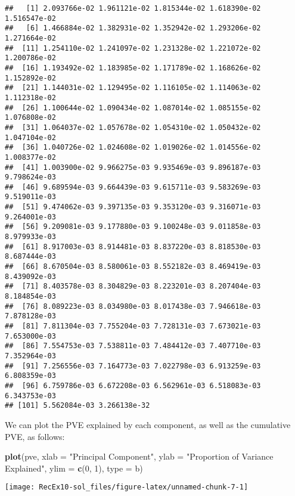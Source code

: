 \documentclass[
]{article}
\newenvironment{Shaded}{\begin{snugshade}}{\end{snugshade}}
\newcommand{\AttributeTok}[1]{\textcolor[rgb]{0.13,0.29,0.53}{#1}}
\newcommand{\DecValTok}[1]{\textcolor[rgb]{0.00,0.00,0.81}{#1}}
\newcommand{\FunctionTok}[1]{\textcolor[rgb]{0.13,0.29,0.53}{\textbf{#1}}}
\newcommand{\NormalTok}[1]{#1}
\newcommand{\StringTok}[1]{\textcolor[rgb]{0.31,0.60,0.02}{#1}}
\begin{document}
\begin{verbatim}
##   [1] 2.093766e-02 1.961121e-02 1.815344e-02 1.618390e-02 1.516547e-02
##   [6] 1.466884e-02 1.382931e-02 1.352942e-02 1.293206e-02 1.271664e-02
##  [11] 1.254110e-02 1.241097e-02 1.231328e-02 1.221072e-02 1.200786e-02
##  [16] 1.193492e-02 1.183985e-02 1.171789e-02 1.168626e-02 1.152892e-02
##  [21] 1.144031e-02 1.129495e-02 1.116105e-02 1.114063e-02 1.112318e-02
##  [26] 1.100644e-02 1.090434e-02 1.087014e-02 1.085155e-02 1.076808e-02
##  [31] 1.064037e-02 1.057678e-02 1.054310e-02 1.050432e-02 1.047104e-02
##  [36] 1.040726e-02 1.024608e-02 1.019026e-02 1.014556e-02 1.008377e-02
##  [41] 1.003900e-02 9.966275e-03 9.935469e-03 9.896187e-03 9.798624e-03
##  [46] 9.689594e-03 9.664439e-03 9.615711e-03 9.583269e-03 9.519011e-03
##  [51] 9.474062e-03 9.397135e-03 9.353120e-03 9.316071e-03 9.264001e-03
##  [56] 9.209081e-03 9.177880e-03 9.100248e-03 9.011858e-03 8.979933e-03
##  [61] 8.917003e-03 8.914481e-03 8.837220e-03 8.818530e-03 8.687444e-03
##  [66] 8.670504e-03 8.580061e-03 8.552182e-03 8.469419e-03 8.439092e-03
##  [71] 8.403578e-03 8.304829e-03 8.223201e-03 8.207404e-03 8.184854e-03
##  [76] 8.089223e-03 8.034980e-03 8.017438e-03 7.946618e-03 7.878128e-03
##  [81] 7.811304e-03 7.755204e-03 7.728131e-03 7.673021e-03 7.653000e-03
##  [86] 7.554753e-03 7.538811e-03 7.484412e-03 7.407710e-03 7.352964e-03
##  [91] 7.256556e-03 7.164773e-03 7.022798e-03 6.913259e-03 6.808359e-03
##  [96] 6.759786e-03 6.672208e-03 6.562961e-03 6.518083e-03 6.343753e-03
## [101] 5.562084e-03 3.266138e-32
\end{verbatim}

We can plot the PVE explained by each component, as well as the
cumulative PVE, as follows:

\begin{Shaded}
\begin{Highlighting}[]
\FunctionTok{plot}\NormalTok{(pve, }
     \AttributeTok{xlab =} \StringTok{"Principal Component"}\NormalTok{, }
     \AttributeTok{ylab =} \StringTok{"Proportion of Variance Explained"}\NormalTok{, }
     \AttributeTok{ylim =} \FunctionTok{c}\NormalTok{(}\DecValTok{0}\NormalTok{, }\DecValTok{1}\NormalTok{),}
     \AttributeTok{type =} \StringTok{\textquotesingle{}b\textquotesingle{}}\NormalTok{)}
\end{Highlighting}
\end{Shaded}

\begin{center}\texttt{[image: RecEx10-sol\_files/figure-latex/unnamed-chunk-7-1]} \end{center}
\end{document}
